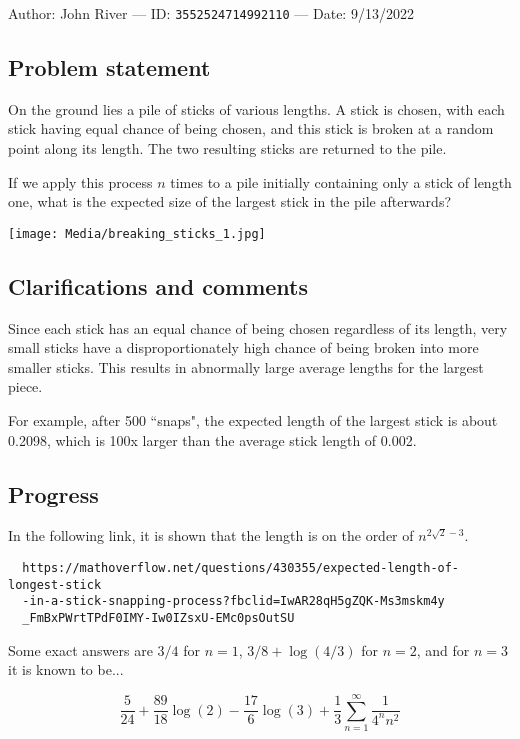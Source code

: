 \documentclass[10pt]{article}
\begin{document}
Author: John River --- ID: \verb`3552524714992110` --- Date: 9/13/2022

\subsection{Problem statement}

On the ground lies a pile of sticks of various lengths. A stick is chosen, with each stick having equal chance of being chosen, and this stick is broken at a random point along its length. The two resulting sticks are returned to the pile.

If we apply this process $n$ times to a pile initially containing only a stick of length one, what is the expected size of the largest stick in the pile afterwards?

\texttt{[image: Media/breaking\_sticks\_1.jpg]}

\subsection{Clarifications and comments}

Since each stick has an equal chance of being chosen regardless of its length, very small sticks have a disproportionately high chance of being broken into more smaller sticks. This results in abnormally large average lengths for the largest piece.

For example, after 500 ``snaps", the expected length of the largest stick is about 0.2098, which is 100x larger than the average stick length of 0.002.

\subsection{Progress}

In the following link, it is shown that the length is on the order of $n^{2\sqrt2-3}$.

\begin{verbatim}
  https://mathoverflow.net/questions/430355/expected-length-of-longest-stick
  -in-a-stick-snapping-process?fbclid=IwAR28qH5gZQK-Ms3mskm4y
  _FmBxPWrtTPdF0IMY-Iw0IZsxU-EMc0psOutSU
\end{verbatim}

Some exact answers are $3/4$ for $n=1$, $3/8+\log(4/3)$ for $n=2$, and for $n=3$ it is known to be...

$$\frac{5}{24}+\frac{89}{18}\log(2)-\frac{17}{6}\log(3)+\frac{1}{3}\sum_{n=1}^\infty\frac{1}{4^nn^2}$$
\end{document}
